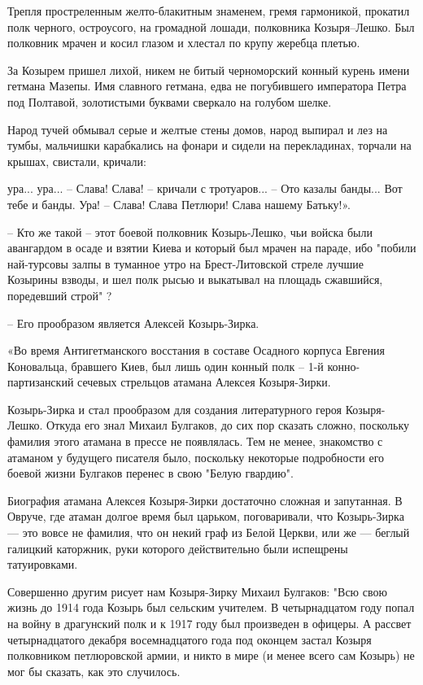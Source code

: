 Трепля простреленным желто-блакитным знаменем, гремя гармоникой, прокатил
полк черного, остроусого, на громадной лошади, полковника Козыря–Лешко. Был
полковник мрачен и косил глазом и хлестал по крупу жеребца плетью.

За Козырем пришел лихой, никем не битый черноморский конный курень имени
гетмана Мазепы. Имя славного гетмана, едва не погубившего императора Петра
под Полтавой, золотистыми буквами сверкало на голубом шелке. 

Народ тучей обмывал серые и желтые стены домов, народ выпирал и лез на тумбы,
мальчишки карабкались на фонари и сидели на перекладинах, торчали на крышах,
свистали, кричали:

ура... ура... – Слава! Слава! – кричали с тротуаров... – Ото казалы банды...
Вот тебе и банды. Ура! – Слава! Слава Петлюри! Слава нашему Батьку!».


– Кто же такой – этот боевой полковник Козырь-Лешко, чьи войска были
авангардом в осаде и взятии Киева и который был мрачен на параде, ибо
"побили най-турсовы залпы в туманное утро на Брест-Литовской стреле лучшие
Козырины взводы, и шел полк рысью и выкатывал на площадь сжавшийся,
поредевший строй" ?

– Его прообразом является Алексей Козырь-Зирка.

«Во время Антигетманского восстания в составе Осадного корпуса Евгения
Коновальца, бравшего Киев, был лишь один конный полк – 1-й конно- партизанский
сечевых стрельцов атамана Алексея Козыря-Зирки. 

Козырь-Зирка и стал прообразом для создания литературного героя Козыря-Лешко.
Откуда его знал Михаил Булгаков, до сих пор сказать сложно, поскольку фамилия
этого атамана в прессе не появлялась. Тем не менее, знакомство с атаманом у
будущего писателя было, поскольку некоторые подробности его боевой жизни
Булгаков перенес в свою "Белую гвардию".

Биография атамана Алексея Козыря-Зирки достаточно сложная и запутанная. В
Овруче, где атаман долгое время был царьком, поговаривали, что Козырь-Зирка —
это вовсе не фамилия, что он некий граф из Белой Церкви, или же — беглый
галицкий каторжник, руки которого действительно были испещрены татуировками.

Совершенно другим рисует нам Козыря-Зирку Михаил Булгаков: "Всю свою жизнь до
1914 года Козырь был сельским учителем. В четырнадцатом году попал на войну в
драгунский полк и к 1917 году был произведен в офицеры. А рассвет
четырнадцатого декабря восемнадцатого года под оконцем застал Козыря
полковником петлюровской армии, и никто в мире (и менее всего сам Козырь) не
мог бы сказать, как это случилось. 

